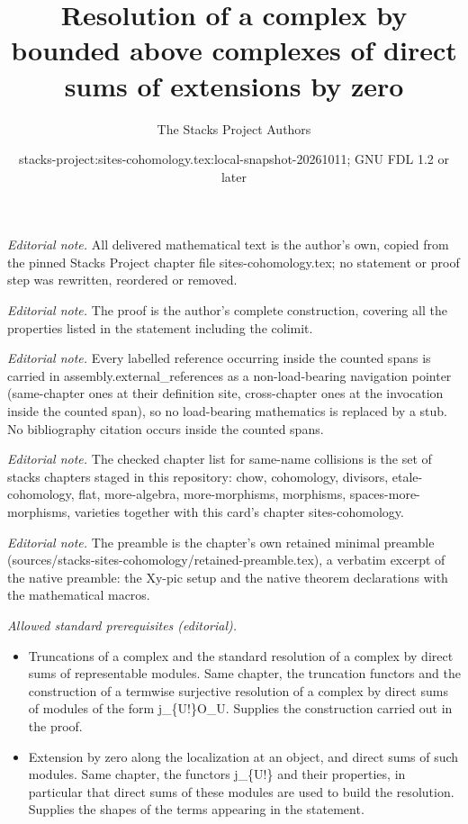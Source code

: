 \documentclass[10pt,a4paper]{amsart}
\title{Resolution of a complex by bounded above complexes of direct sums of extensions by zero}
\author{The Stacks Project Authors}
\date{stacks-project:sites-cohomology.tex:local-snapshot-20261011; GNU FDL 1.2 or later}
\theoremstyle{plain}
\theoremstyle{definition}
\theoremstyle{remark}
\numberwithin{equation}{subsection}
\begin{document}
\maketitle
\noindent\textit{Editorial note.} All delivered mathematical text is the author's own, copied from the pinned Stacks Project chapter file sites-cohomology.tex; no statement or proof step was rewritten, reordered or removed.\par\medskip
\noindent\textit{Editorial note.} The proof is the author's complete construction, covering all the properties listed in the statement including the colimit.\par\medskip
\noindent\textit{Editorial note.} Every labelled reference occurring inside the counted spans is carried in assembly.external\_references as a non-load-bearing navigation pointer (same-chapter ones at their definition site, cross-chapter ones at the invocation inside the counted span), so no load-bearing mathematics is replaced by a stub. No bibliography citation occurs inside the counted spans.\par\medskip
\noindent\textit{Editorial note.} The checked chapter list for same-name collisions is the set of stacks chapters staged in this repository: chow, cohomology, divisors, etale-cohomology, flat, more-algebra, more-morphisms, morphisms, spaces-more-morphisms, varieties together with this card's chapter sites-cohomology.\par\medskip
\noindent\textit{Editorial note.} The preamble is the chapter's own retained minimal preamble (sources/stacks-sites-cohomology/retained-preamble.tex), a verbatim excerpt of the native preamble: the Xy-pic setup and the native theorem declarations with the mathematical macros.\par\medskip
\noindent\textit{Allowed standard prerequisites (editorial).}\begin{itemize}
\item Truncations of a complex and the standard resolution of a complex by direct sums of representable modules. Same chapter, the truncation functors and the construction of a termwise surjective resolution of a complex by direct sums of modules of the form j\_\{U!\}O\_U. Supplies the construction carried out in the proof.
\item Extension by zero along the localization at an object, and direct sums of such modules. Same chapter, the functors j\_\{U!\} and their properties, in particular that direct sums of these modules are used to build the resolution. Supplies the shapes of the terms appearing in the statement.
\end{itemize}\medskip
\end{document}
